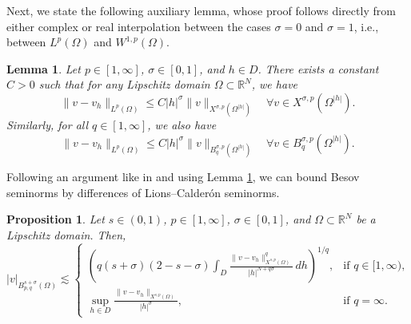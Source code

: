 \documentclass[]{amsart}
\newtheorem{Lemma}[theorem]{Lemma}
\newtheorem{proposition}[theorem]{Proposition}
\theoremstyle{definition}
\theoremstyle{definition}
\theoremstyle{remark}
\numberwithin{equation}{section}
\begin{document}
	Next, we state the following auxiliary lemma, whose proof follows directly from either complex or real interpolation between the cases \( \sigma = 0 \) and \( \sigma = 1 \), i.e., between \( L^p(\Omega) \) and \( W^{1,p}(\Omega) \). 
	
	\begin{Lemma} 
	\label{Regularidad: Lemma estimativa de error}
		Let \( p \in [1, \infty] \), \( \sigma \in [0,1] \), and \( h \in D \). There exists a constant \( C > 0 \) such that for any Lipschitz domain \( \Omega \subset \mathbb{R}^N \), we have
		\[
		\|v - v_h\|_{L^p(\Omega)} \leq C |h|^\sigma \|v\|_{X^{\sigma, p}(\Omega^{|h|})} \quad \forall v \in X^{\sigma, p}(\Omega^{|h|}).
		\]
        Similarly, for all $q \in [1,\infty]$, we also have
        \begin{equation} \label{eq:traslacion_Besov}
            \|v - v_h\|_{L^p(\Omega)} \leq C |h|^\sigma \|v\|_{B^{\sigma, p}_q(\Omega^{|h|})} \quad \forall v \in B^{\sigma, p}_q(\Omega^{|h|}).
        \end{equation}
	\end{Lemma}
	
    Following an argument like in
    \cite[Proposition 2.1]{borthagaray2023besov} and using Lemma \ref{Regularidad: Lemma estimativa de error}, we can bound  Besov seminorms by differences of Lions–Calderón seminorms.
	
	\begin{proposition}
		\label{Resularidad: Reiteración Besov}
		Let \( s \in (0,1) \), \( p \in [1, \infty] \), \( \sigma \in [0,1] \), and \( \Omega \subset \mathbb{R}^N \) be a Lipschitz domain. Then,
		\[
		|v|_{B_{p,q}^{s+\sigma}(\Omega)} \lesssim 
		\begin{cases}
			\left(q(s+\sigma)(2-s-\sigma) \displaystyle\int_{D} \frac{\|v - v_h\|_{X^{s,p}(\Omega)}^q}{|h|^{N+q\sigma}} \, dh\right)^{1/q}, & \text{if } q \in [1, \infty), \\[1em]
			\displaystyle \sup_{h \in D} \frac{\|v - v_h\|_{X^{s,p}(\Omega)}}{|h|^\sigma}, & \text{if } q = \infty.
		\end{cases}
		\]
	\end{proposition}
	
\end{document}
